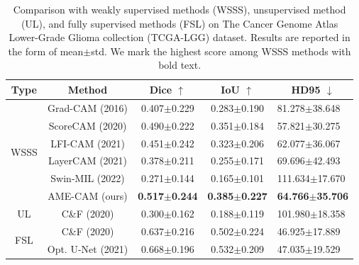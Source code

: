 \begin{table}
\centering
\caption{Comparison with weakly supervised methods (WSSS), unsupervised method (UL), and fully supervised methods (FSL) on The Cancer Genome Atlas Lower-Grade Glioma collection (TCGA-LGG) dataset. Results are reported in the form of mean$\pm$std. We mark the highest score among WSSS methods with bold text.}
\label{Table:Supple_TCGA-LGG}
\begin{tabular}{c|c|c|c|l}
\hline
Type                  & Method            & Dice $\uparrow$       & IoU $\uparrow$        & \multicolumn{1}{c}{HD95 $\downarrow$} \\ \hline
\multirow{6}{*}{WSSS} & Grad-CAM (2016)   & 0.407$\pm$0.229          & 0.283$\pm$0.190          & 81.278$\pm$38.648                        \\
                      & ScoreCAM (2020)   & 0.490$\pm$0.222          & 0.351$\pm$0.184          & 57.821$\pm$30.275                        \\
                      & LFI-CAM (2021)    & 0.451$\pm$0.242          & 0.323$\pm$0.206          & 62.077$\pm$36.067                        \\
                      & LayerCAM (2021)   & 0.378$\pm$0.211          & 0.255$\pm$0.171          & 69.696$\pm$42.493                        \\
                      & Swin-MIL (2022)   & 0.271$\pm$0.144          & 0.165$\pm$0.101          & 111.634$\pm$17.670                       \\
                      & AME-CAM (ours)    & \textbf{0.517$\pm$0.244} & \textbf{0.385$\pm$0.227} & \textbf{64.766$\pm$35.706}               \\ \hline
UL                    & C\&F (2020)       & 0.300$\pm$0.162          & 0.188$\pm$0.119          & 101.980$\pm$18.358                       \\ \hline
\multirow{2}{*}{FSL}  & C\&F (2020)       & 0.637$\pm$0.216          & 0.502$\pm$0.224          & 46.925$\pm$17.889                        \\
                      & Opt. U-Net (2021) & 0.668$\pm$0.196          & 0.532$\pm$0.209          & 47.035$\pm$19.529                        \\ \hline 
\end{tabular}
\end{table}